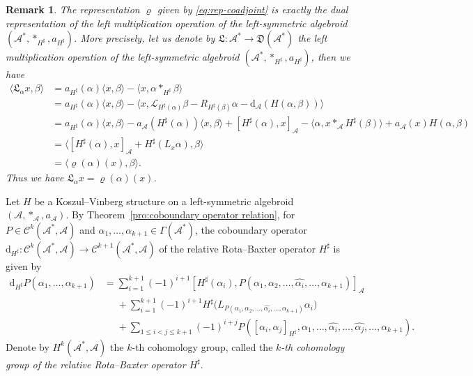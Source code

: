 \documentclass[10pt,a4paper]{amsart}
\numberwithin{equation}{section}
\newtheorem{rmk}[thm]{Remark}
\newcommand{\huaA}{\mathcal{A}}
\newcommand{\huaC}{\mathcal{C}}
\newcommand{\huaL}{\mathcal{L}}
\newcommand{\frkL}{\mathfrak L}
\newcommand{\frkD}{\mathfrak D}
\newcommand{\dM}{\mathrm{d}}
\begin{document}
\begin{rmk}%
The representation $\varrho$ given by \eqref{eq:rep-coadjoint} is exactly the dual representation of the left multiplication operation of the left-symmetric algebroid $(\huaA^*,\ast_{H^\sharp},a_{H^\sharp})$. More precisely, let us denote by $\frkL\colon \huaA^*\longrightarrow \frkD(\huaA^*)$ the left multiplication operation of the left-symmetric algebroid $(\huaA^*,\ast_{H^\sharp},a_{H^\sharp})$, then we have
\begin{align*}
\langle\frkL_\alpha x,\beta\rangle&=a_{H^\sharp}(\alpha)\langle x,\beta\rangle-\langle x,\alpha \ast_{H^\sharp} \beta\rangle
\\
&=a_{H^\sharp}(\alpha)\langle x,\beta\rangle-\langle x,\huaL_{H^\sharp(\alpha)}\beta-R_{H^\sharp(\beta)}\alpha-{\dM_\huaA} (H(\alpha,\beta))\rangle
\\
&=a_{H^\sharp}(\alpha)\langle x,\beta\rangle\!-\!a_\huaA( H^\sharp(\alpha))\langle x,\beta\rangle\!+\![H^\sharp(\alpha),x]_{\huaA}\!-\!\langle\alpha,x\ast_\huaA H^\sharp(\beta)\rangle
\!+\!a_\huaA(x)H(\alpha,\beta)
\\
&=\langle[H^\sharp(\alpha),x]_{\huaA}+H^\sharp(L_x\alpha ),\beta\rangle
\\
&=\langle\varrho(\alpha)(x),\beta\rangle.
\end{align*}
Thus we have $\frkL_\alpha x=\varrho(\alpha)(x)$.
\end{rmk}

Let $H$ be a Koszul--Vinberg structure on a left-symmetric algebroid $(\huaA,\ast_\huaA,a_\huaA)$. By Theo\-rem~\ref{pro:coboundary operator relation}, for $P\in\huaC^k(\huaA^*,\huaA)$ and $\alpha_1,\dots,\alpha_{k+1}\in\Gamma{(\huaA^*)}$, the coboundary operator $\dM_{H^\sharp}\colon \huaC^k(\huaA^*,\huaA)\allowbreak\longrightarrow \huaC^{k+1}(\huaA^*,\huaA)$ of the relative Rota--Baxter operator $H^\sharp$ is given by
\begin{align*}%
\dM_{H^\sharp}P(\alpha_1,\dots,\alpha_{k+1})
&=\sum_{i=1}^{k+1}(-1)^{i+1}[H^\sharp(\alpha_i),P(\alpha_1,\alpha_2,
\dots,\hat{\alpha_i},\dots,\alpha_{k+1})]_{\huaA}
\\
&\phantom{=}+\sum_{i=1}^{k+1}(-1)^{i+1}H^\sharp\big(L_{P(\alpha_1,\alpha_2, \dots,\hat{\alpha_i},\dots,\alpha_{k+1})}\alpha_i\big)
\\
&\phantom{=}+\sum_{1\leq i<j\leq {k+1}}(-1)^{i+j}P([\alpha_i,\alpha_j]_{H^\sharp},\alpha_1, \dots,\hat{\alpha_i},\dots,\hat{\alpha_j},\dots,\alpha_{k+1}).
\end{align*}
Denote by $H^k(\huaA^*,\huaA)$ the $k$-th cohomology group, called the {\it $k$-th cohomology group of the relative Rota--Baxter operator $H^\sharp$}.
\end{document}
